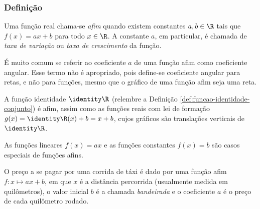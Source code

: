 \subsubsection{Definição}

\begin{definition}
Uma função real chama-se \emph{afim} quando existem constantes $a, b
\in \R$ tais que $f(x) = ax +b$ para todo $x\in \R$. 
A constante $a$, em particular, é chamada de \emph{taxa de variação} ou \emph{taxa de crescimento} da função.
\end{definition}

\begin{remark}
É muito comum se referir ao coeficiente $a$ de uma função afim como coeficiente angular.
Esse termo não é apropriado, pois define-se coeficiente angular para
retas, e não para funções, mesmo que o gráfico de uma
função afim seja uma reta.
\end{remark}

\begin{example}
A função identidade $\identity \R$ (relembre a Definição \ref{def:funcao-identidade-conjunto}) é afim, 
assim como as funções reais com lei de formação $g(x) = \identity \R (x)+b = x+b$, 
cujos gráficos são translações verticais de $\identity \R$.
\end{example}

\begin{example}
As funções lineares $f(x) = ax$ e as funções constantes $f(x) = b$ são casos especiais de funções afins.
\end{example}

\begin{example}
O preço a se pagar por uma corrida de táxi é dado por uma função
afim $f: x \mapsto ax+b$, em que $x$ é a distância percorrida
(usualmente medida em quilômetros), o valor inicial $b$ é a chamada
\emph{bandeirada} e o coeficiente $a$ é o preço de cada quilômetro
rodado.
\end{example}